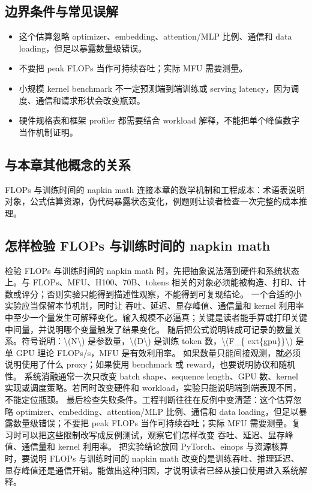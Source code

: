 \documentclass[a4paper]{article}
\begin{document}
\subsection{边界条件与常见误解}
\begin{itemize}
\item 这个估算忽略 optimizer、embedding、attention/MLP 比例、通信和 data loading，但足以暴露数量级错误。
\item 不要把 peak FLOPs 当作可持续吞吐；实际 MFU 需要测量。
\item 小规模 kernel benchmark 不一定预测端到端训练或 serving latency，因为调度、通信和请求形状会改变瓶颈。
\item 硬件规格表和框架 profiler 都需要结合 workload 解释，不能把单个峰值数字当作机制证明。
\end{itemize}
\subsection{与本章其他概念的关系}
FLOPs 与训练时间的 napkin math 连接本章的数学机制和工程成本：术语表说明对象，公式估算资源，伪代码暴露状态变化，例题则让读者检查一次完整的成本推理。
\subsection{怎样检验 FLOPs 与训练时间的 napkin math}
检验 FLOPs 与训练时间的 napkin math 时，先把抽象说法落到硬件和系统状态上。与 FLOPs、MFU、H100、70B、tokens 相关的对象必须能被构造、打印、计数或评分；否则实验只能得到描述性观察，不能得到可复现结论。
一个合适的小实验应当保留本节机制，同时让 吞吐、延迟、显存峰值、通信量和 kernel 利用率 中至少一个量发生可解释变化。输入规模不必逼真；关键是读者能手算或打印关键中间量，并说明哪个变量触发了结果变化。
随后把公式说明转成可记录的数量关系。符号说明：\textbackslash{}(N\textbackslash{}) 是参数量，\textbackslash{}(D\textbackslash{}) 是训练 token 数，\textbackslash{}(F\_\{ ext\{gpu\}\}\textbackslash{}) 是单 GPU 理论 FLOPs/s，MFU 是有效利用率。 如果数量只能间接观测，就必须说明使用了什么 proxy；如果使用 benchmark 或 reward，也要说明协议和随机性。
系统消融通常一次只改变 batch shape、sequence length、GPU 数、kernel 实现或调度策略。若同时改变硬件和 workload，实验只能说明端到端表现不同，不能定位瓶颈。
最后检查失败条件。工程判断往往在反例中变清楚：这个估算忽略 optimizer、embedding、attention/MLP 比例、通信和 data loading，但足以暴露数量级错误；不要把 peak FLOPs 当作可持续吞吐；实际 MFU 需要测量。复习时可以把这些限制改写成反例测试，观察它们怎样改变 吞吐、延迟、显存峰值、通信量和 kernel 利用率。
把实验结论放回 PyTorch、einops 与资源核算 时，要说明 FLOPs 与训练时间的 napkin math 改变的是训练吞吐、推理延迟、显存峰值还是通信开销。能做出这种归因，才说明读者已经从接口使用进入系统解释。
\end{document}
